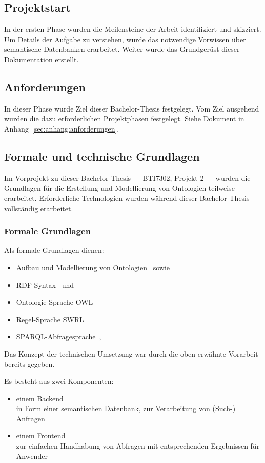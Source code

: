 \subsection{Projektstart}
\label{subsec:projektstart}
In der ersten Phase wurden die Meilensteine der Arbeit identifiziert und skizziert. Um Details der Aufgabe zu verstehen, wurde das notwendige Vorwissen über semantische Datenbanken erarbeitet. Weiter wurde das Grundgerüst dieser Dokumentation erstellt.

\subsection{Anforderungen}
\label{subsec:anforderungen}
In dieser Phase wurde Ziel dieser Bachelor-Thesis festgelegt. Vom Ziel ausgehend wurden die dazu erforderlichen Projektphasen festgelegt. Siehe Dokument in Anhang~\ref{sec:anhang:anforderungen}.

\subsection{Formale und technische Grundlagen}
\label{sub:formale_und_technische_grundlagen}
Im Vorprojekt zu dieser Bachelor-Thesis --- BTI7302, Projekt 2 --- wurden die Grundlagen für die Erstellung und Modellierung von Ontologien teilweise erarbeitet. Erforderliche Technologien wurden während dieser Bachelor-Thesis vollständig erarbeitet.

\subsubsection{Formale Grundlagen}
Als formale Grundlagen dienen:
\begin{itemize}
    \item Aufbau und Modellierung von Ontologien~\cite{IspekOntoBedeutung} sowie~\cite{ISpekOntoGeschichte}
    \item RDF-Syntax~\cite{w3rdf} und~\cite{w3rdf_syntax}
    \item Ontologie-Sprache OWL~\cite{w3owl}
    \item Regel-Sprache SWRL~\cite{swrl}
    \item SPARQL-Abfragesprache~\cite{w3sparql_querylang},~\cite{w3sparql_overview}
\end{itemize}

Das Konzept der technischen Umsetzung war durch die oben erwähnte Vorarbeit bereits gegeben.

Es besteht aus zwei Komponenten:
\begin{itemize}
    \item einem Backend\\
        in Form einer semantischen Datenbank, zur Verarbeitung von (Such-) Anfragen
    \item einem Frontend\\
        zur einfachen Handhabung von Abfragen mit entsprechenden Ergebnissen für Anwender
\end{itemize}

